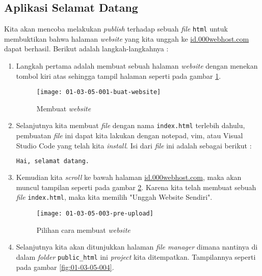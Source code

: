 \subsection{Aplikasi Selamat Datang}

Kita akan mencoba melakukan \textit{publish} terhadap sebuah \textit{file} \texttt{html} untuk membuktikan bahwa halaman \textit{website} yang kita unggah ke \url{id.000webhost.com} dapat berhasil. Berikut adalah langkah-langkahnya :

\begin{enumerate}
	
	\item Langkah pertama adalah membuat sebuah halaman \textit{website} dengan menekan tombol kiri atas sehingga tampil halaman seperti pada gambar \ref{fig:01-03-05-001}.
	
	\begin{figure}[H]
		\centering
		\texttt{[image: 01-03-05-001-buat-website]}
		\caption{Membuat \textit{website}}
		\label{fig:01-03-05-001}
	\end{figure}
	
	\item Selanjutnya kita membuat \textit{file} dengan nama \texttt{index.html} terlebih dahulu, pembuatan \textit{file} ini dapat kita lakukan dengan notepad, vim, atau Visual Studio Code yang telah kita \textit{install}. Isi dari \textit{file} ini adalah sebagai berikut :
	
	\begin{lstlisting}[language=html]
Hai, selamat datang. \end{lstlisting}	
	
	\item Kemudian kita \textit{scroll} ke bawah halaman \url{id.000webhost.com}, maka akan muncul tampilan seperti pada gambar \ref{fig:01-03-05-003}. Karena kita telah membuat sebuah \textit{file} \texttt{index.html}, maka kita memilih "Unggah Website Sendiri".
	
	\begin{figure}[H]
		\centering
		\texttt{[image: 01-03-05-003-pre-upload]}
		\caption{Pilihan cara membuat \textit{website}}
		\label{fig:01-03-05-003}
	\end{figure}
	
	\item Selanjutnya kita akan ditunjukkan halaman \textit{file manager} dimana nantinya di dalam \textit{folder} \texttt{public\_html} ini \textit{project} kita ditempatkan. Tampilannya seperti pada gambar \ref{fig:01-03-05-004}.
	

\end{enumerate}

